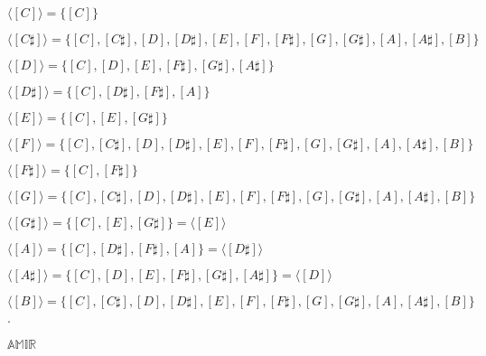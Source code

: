 \documentclass[12pt, a4paper]{article}
\begin{document}
\vspace{4mm}

\begin{description}

    \item $\langle [C]\rangle=\{[C]\}$
    
    \item $\langle [C\sharp]\rangle=\{[C],[C\sharp],[D],[D\sharp],[E],[F],[F\sharp],[G],[G\sharp],[A],[A\sharp],[B]\}$

    \item $\langle [D]\rangle=\{[C],[D],[E],[F\sharp],[G\sharp],[A\sharp]\}$
    
    \item $\langle [D\sharp]\rangle=\{[C],[D\sharp],[F\sharp],[A]\}$
    
    \item $\langle [E]\rangle=\{[C],[E],[G\sharp]\}$
    
    \item $\langle [F]\rangle=\{[C],[C\sharp],[D],[D\sharp],[E],[F],[F\sharp],[G],[G\sharp],[A],[A\sharp],[B]\}$
    
    \item $\langle [F\sharp]\rangle=\{[C],[F\sharp]\}$
    
    \item $\langle [G]\rangle=\{[C],[C\sharp],[D],[D\sharp],[E],[F],[F\sharp],[G],[G\sharp],[A],[A\sharp],[B]\}$
    
    \item $\langle [G\sharp]\rangle=\{[C],[E],[G\sharp]\}=\langle [E]\rangle$
    
    \item $\langle [A]\rangle=\{[C],[D\sharp],[F\sharp],[A]\}=\langle [D\sharp]\rangle$
    
    \item $\langle [A\sharp]\rangle=\{[C],[D],[E],[F\sharp],[G\sharp],[A\sharp]\}=\langle [D]\rangle$
    
    \item $\langle [B]\rangle=\{[C],[C\sharp],[D],[D\sharp],[E],[F],[F\sharp],[G],[G\sharp],[A],[A\sharp],[B]\}$.
    
\end{description}
    


\newpage

\centerline{$\mathbb{AMIR}$}
\end{document}
